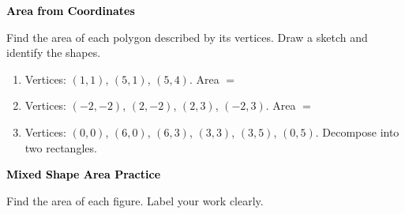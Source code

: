 \documentclass[12pt, letterpaper, fleqn]{article}
\newcommand{\blank}{\underline{\hspace{2.2cm}}}
\begin{document}
\newpage

\begin{tcolorbox}[colback=black!10]
\large\textcolor{black}{\textbf{Area from Coordinates}}
\end{tcolorbox}

\noindent
Find the area of each polygon described by its vertices. Draw a sketch and identify the shapes.

\vspace{3mm}

\begin{enumerate}[itemsep=3cm, leftmargin=0.6cm]

\item Vertices: $(1, 1)$, $(5, 1)$, $(5, 4)$. \quad Area $=$ \blank

\vspace{2cm}

\item Vertices: $(-2, -2)$, $(2, -2)$, $(2, 3)$, $(-2, 3)$. \quad Area $=$ \blank

\vspace{2cm}

\item Vertices: $(0, 0)$, $(6, 0)$, $(6, 3)$, $(3, 3)$, $(3, 5)$, $(0, 5)$. Decompose into two rectangles.

\vspace{2cm}

\end{enumerate}

\newpage

\begin{tcolorbox}[colback=black!10]
\large\textcolor{black}{\textbf{Mixed Shape Area Practice}}
\end{tcolorbox}

\noindent
Find the area of each figure. Label your work clearly.

\vspace{3mm}
\end{document}
